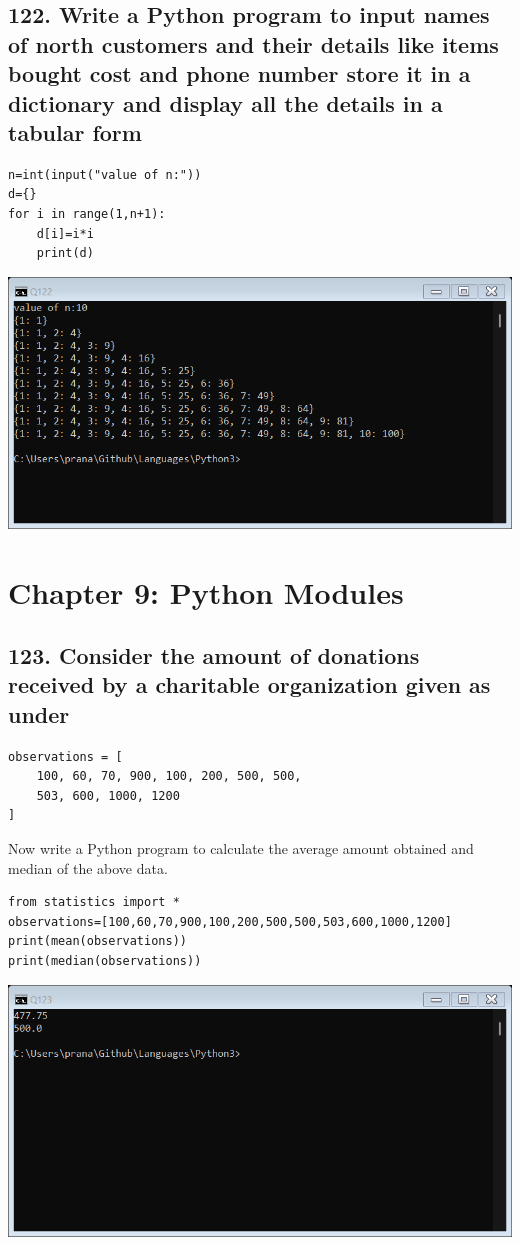\documentclass[12pt]{article}
\begin{document}
\subsection*{122.  Write a Python program to input names of
north customers and their details like items
bought cost and phone number store it in a
dictionary and display all the details in a tabular
form}
\begin{verbatim}
n=int(input("value of n:"))
d={}
for i in range(1,n+1):
    d[i]=i*i
    print(d)
\end{verbatim}
\includegraphics[width=\linewidth]{images/122.png}

\section*{Chapter 9: Python Modules}
\subsection*{123. Consider the amount of donations received
by a charitable organization given as under}
\begin{verbatim}
observations = [
    100, 60, 70, 900, 100, 200, 500, 500, 
    503, 600, 1000, 1200
]
\end{verbatim}
Now write a Python program to calculate the
average amount obtained and median of the
above data.
\begin{verbatim}
from statistics import *
observations=[100,60,70,900,100,200,500,500,503,600,1000,1200]
print(mean(observations))
print(median(observations))
\end{verbatim}
\includegraphics[width=\linewidth]{images/123.png}
\end{document}
